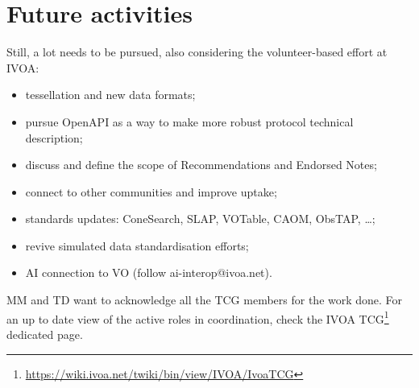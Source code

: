 \documentclass[11pt,twoside]{article}
\begin{document}

\section{Future activities}

Still, a lot needs to be pursued, also considering the volunteer-based effort at IVOA:
\begin{itemize}
  \item tessellation and new data formats;
  \item pursue OpenAPI as a way to make more robust protocol technical description;
  \item discuss and define the scope of Recommendations and Endorsed Notes;
  \item connect to other communities and improve uptake;
  \item standards updates: ConeSearch, SLAP, VOTable, CAOM, ObsTAP, \ldots;
  \item revive simulated data standardisation efforts;
  \item AI connection to VO (follow ai-interop@ivoa.net).
\end{itemize}

\acknowledgements MM and TD want to acknowledge all the TCG members for the work done. For an up to date view of the active roles in coordination, check the IVOA TCG\footnote{\url{https://wiki.ivoa.net/twiki/bin/view/IVOA/IvoaTCG}} dedicated page.


\end{document}
